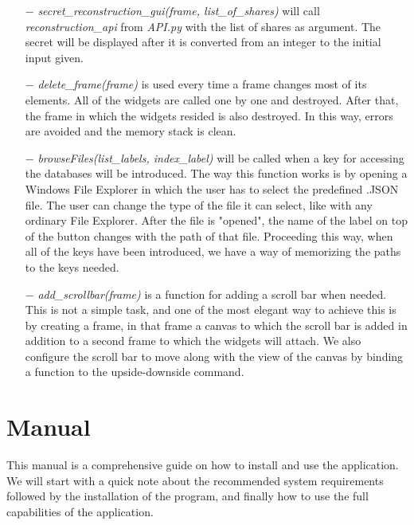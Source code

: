 \documentclass[12pt, a4paper, oneside]{book}
\begin{document}
    \begin{itemize}
        \item[$-$] {\it secret\_reconstruction\_gui(frame, list\_of\_shares)} will call {\it reconstruction\_api} from {\it API.py} with the list of shares as argument. The secret will be displayed after it is converted from an integer to the initial input given.
    \end{itemize}
    \begin{itemize}
        \item[$-$] {\it delete\_frame(frame)} is used every time a frame changes most of its elements. All of the widgets are called one by one and destroyed. After that, the frame in which the widgets resided is also destroyed. In this way, errors are avoided and the memory stack is clean.
    \end{itemize}
    \begin{itemize}
        \item[$-$] {\it browseFiles(list\_labels, index\_label)} will be called when a key for accessing the databases will be introduced. The way this function works is by opening a Windows File Explorer in which the user has to select the predefined .JSON file. The user can change the type of the file it can select, like with any ordinary File Explorer. After the file is "opened", the name of the label on top of the button changes with the path of that file. Proceeding this way, when all of the keys have been introduced, we have a way of memorizing the paths to the keys needed.
    \end{itemize}
    \begin{itemize}
        \item[$-$] {\it add\_scrollbar(frame)} is a function for adding a scroll bar when needed. This is not a simple task, and one of the most elegant way to achieve this is by creating a frame, in that frame a canvas to which the scroll bar is added in addition to a second frame to which the widgets will attach. We also configure the scroll bar to move along with the view of the canvas by binding a function to the upside-downside command.
    \end{itemize}

    \section{Manual}
    This manual is a comprehensive guide on how to install and use the application. We will start with a quick note about the recommended system requirements followed by the installation of the program, and finally how to use the full capabilities of the application.
\end{document}
